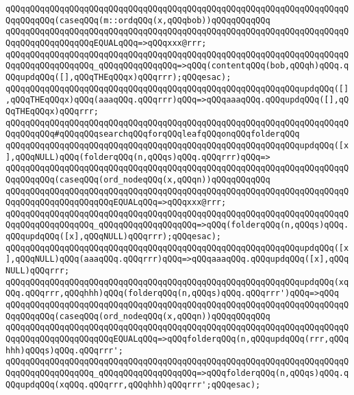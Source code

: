 \verb|qQQqqQQqqQQqqQQqqQQqqQQqqQQqqQQqqQQqqQQqqQQqqQQqqQQqqQQqqQQqqQQqqQQqqQQqqQQqqQQq(caseqQQq(m::ordqQQq(x,qQQqbob))qQQqqQQqqQQq|\newline
\verb|qQQqqQQqqQQqqQQqqQQqqQQqqQQqqQQqqQQqqQQqqQQqqQQqqQQqqQQqqQQqqQQqqQQqqQQqqQQqqQQqqQQqqQQqEQUALqQQq=>qQQqxxx@rrr;|\newline
\verb|qQQqqQQqqQQqqQQqqQQqqQQqqQQqqQQqqQQqqQQqqQQqqQQqqQQqqQQqqQQqqQQqqQQqqQQqqQQqqQQqqQQqqQQq_qQQqqQQqqQQqqQQq=>qQQq(contentqQQq(bob,qQQqh)qQQq.qQQqupdqQQq([],qQQqTHEqQQqx)qQQqrrr);qQQqesac);|\newline
\verb|qQQqqQQqqQQqqQQqqQQqqQQqqQQqqQQqqQQqqQQqqQQqqQQqqQQqqQQqqQQqupdqQQq([],qQQqTHEqQQqx)qQQq(aaaqQQq.qQQqrrr)qQQq=>qQQqaaaqQQq.qQQqupdqQQq([],qQQqTHEqQQqx)qQQqrrr;|\newline
\verb|qQQqqQQqqQQqqQQqqQQqqQQqqQQqqQQqqQQqqQQqqQQqqQQqqQQqqQQqqQQqqQQqqQQqqQQqqQQqqQQq#qQQqqQQqsearchqQQqforqQQqleafqQQqonqQQqfolderqQQq|\newline
\verb|qQQqqQQqqQQqqQQqqQQqqQQqqQQqqQQqqQQqqQQqqQQqqQQqqQQqqQQqqQQqupdqQQq([x],qQQqNULL)qQQq(folderqQQq(n,qQQqs)qQQq.qQQqrrr)qQQq=>|\newline
\verb|qQQqqQQqqQQqqQQqqQQqqQQqqQQqqQQqqQQqqQQqqQQqqQQqqQQqqQQqqQQqqQQqqQQqqQQqqQQqqQQq(caseqQQq(ord_nodeqQQq(x,qQQqn))qQQqqQQqqQQq|\newline
\verb|qQQqqQQqqQQqqQQqqQQqqQQqqQQqqQQqqQQqqQQqqQQqqQQqqQQqqQQqqQQqqQQqqQQqqQQqqQQqqQQqqQQqqQQqqQQqEQUALqQQq=>qQQqxxx@rrr;|\newline
\verb|qQQqqQQqqQQqqQQqqQQqqQQqqQQqqQQqqQQqqQQqqQQqqQQqqQQqqQQqqQQqqQQqqQQqqQQqqQQqqQQqqQQqqQQq_qQQqqQQqqQQqqQQqqQQq=>qQQq(folderqQQq(n,qQQqs)qQQq.qQQqupdqQQq([x],qQQqNULL)qQQqrrr);qQQqesac);|\newline
\verb|qQQqqQQqqQQqqQQqqQQqqQQqqQQqqQQqqQQqqQQqqQQqqQQqqQQqqQQqqQQqupdqQQq([x],qQQqNULL)qQQq(aaaqQQq.qQQqrrr)qQQq=>qQQqaaaqQQq.qQQqupdqQQq([x],qQQqNULL)qQQqrrr;|\newline
\verb|qQQqqQQqqQQqqQQqqQQqqQQqqQQqqQQqqQQqqQQqqQQqqQQqqQQqqQQqqQQqupdqQQq(xqQQq.qQQqrrr,qQQqhhh)qQQq(folderqQQq(n,qQQqs)qQQq.qQQqrrr')qQQq=>qQQq|\newline
\verb|qQQqqQQqqQQqqQQqqQQqqQQqqQQqqQQqqQQqqQQqqQQqqQQqqQQqqQQqqQQqqQQqqQQqqQQqqQQqqQQq(caseqQQq(ord_nodeqQQq(x,qQQqn))qQQqqQQqqQQq|\newline
\verb|qQQqqQQqqQQqqQQqqQQqqQQqqQQqqQQqqQQqqQQqqQQqqQQqqQQqqQQqqQQqqQQqqQQqqQQqqQQqqQQqqQQqqQQqqQQqEQUALqQQq=>qQQqfolderqQQq(n,qQQqupdqQQq(rrr,qQQqhhh)qQQqs)qQQq.qQQqrrr';|\newline
\verb|qQQqqQQqqQQqqQQqqQQqqQQqqQQqqQQqqQQqqQQqqQQqqQQqqQQqqQQqqQQqqQQqqQQqqQQqqQQqqQQqqQQqqQQq_qQQqqQQqqQQqqQQqqQQq=>qQQqfolderqQQq(n,qQQqs)qQQq.qQQqupdqQQq(xqQQq.qQQqrrr,qQQqhhh)qQQqrrr';qQQqesac);|\newline
